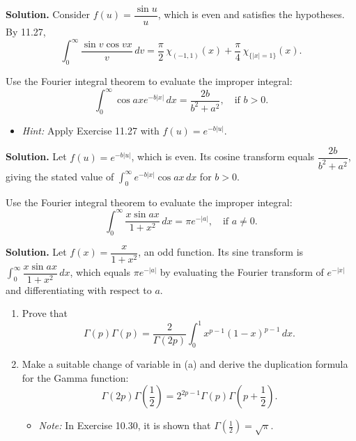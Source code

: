 \noindent\textbf{Solution.}
Consider $f(u)=\dfrac{\sin u}{u}$, which is even and satisfies the hypotheses. By 11.27,
\[\int_0^{\infty}\frac{\sin v\cos vx}{v}\,dv=\frac{\pi}{2}\,\chi_{(-1,1)}(x)+\frac{\pi}{4}\,\chi_{\{|x|=1\}}(x).\]

\begin{problembox}
Use the Fourier integral theorem to evaluate the improper integral:
\[
\int_0^\infty \cos ax e^{-b|x|} \, dx = \frac{2b}{b^2 + a^2}, \quad \text{if } b > 0.
\]
\begin{itemize}
\item \textit{Hint:} Apply Exercise 11.27 with $f(u) = e^{-b|u|}$.
\end{itemize}
\end{problembox}

\noindent\textbf{Solution.}
Let $f(u)=e^{-b|u|}$, which is even. Its cosine transform equals $\dfrac{2b}{b^2+a^2}$, giving the stated value of $\int_0^{\infty}e^{-b|x|}\cos ax\,dx$ for $b>0$.

\begin{problembox}
Use the Fourier integral theorem to evaluate the improper integral:
\[
\int_0^\infty \frac{x \sin ax}{1 + x^2} \, dx = \pi e^{-|a|}, \quad \text{if } a \neq 0.
\]
\end{problembox}

\noindent\textbf{Solution.}
Let $f(x)=\dfrac{x}{1+x^2}$, an odd function. Its sine transform is $\int_0^{\infty}\dfrac{x\sin ax}{1+x^2}\,dx$, which equals $\pi e^{-|a|}$ by evaluating the Fourier transform of $e^{-|x|}$ and differentiating with respect to $a$.

\begin{problembox}
\begin{enumerate}[label=(\alph*)]
\item Prove that
\[
\Gamma(p) \Gamma(p) = \frac{2}{\Gamma(2p)} \int_0^1 x^{p-1} (1 - x)^{p-1} \, dx.
\]
\item Make a suitable change of variable in (a) and derive the duplication formula for the Gamma function:
\[
\Gamma(2p) \Gamma\left(\frac{1}{2}\right) = 2^{2p-1} \Gamma(p) \Gamma\left(p + \frac{1}{2}\right).
\]
\begin{itemize}
\item \textit{Note:} In Exercise 10.30, it is shown that $\Gamma\left(\frac{1}{2}\right) = \sqrt{\pi}$.
\end{itemize}
\end{enumerate}
\end{problembox}

